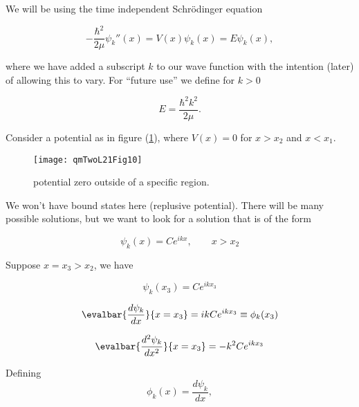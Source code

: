 We will be using the time independent Schr\"{o}dinger equation

\begin{equation}\label{eqn:qmTwoL21:430}
- \frac{\hbar^2}{2 \mu} \psi_k''(x) = V(x) \psi_k(x) = E \psi_k(x),
\end{equation}

where we have added a subscript $k$ to our wave function with the intention (later) of allowing this to vary.  For ``future use'' we define for $k > 0$

\begin{equation}\label{eqn:qmTwoL21:450}
E = \frac{\hbar^2 k^2}{2 \mu}.
\end{equation}

Consider a potential as in figure (\ref{fig:qmTwoL21:qmTwoL21Fig10}), where $V(x) = 0$ for $x > x_2$ and $x < x_1$.

\begin{figure}[htp]
   \centering
   \texttt{[image: qmTwoL21Fig10]}
   \caption{potential zero outside of a specific region.}\label{fig:qmTwoL21:qmTwoL21Fig10}
\end{figure}

We won't have bound states here (replusive potential).  There will be many possible solutions, but we want to look for a solution that is of the form

\begin{equation}\label{eqn:qmTwoL21:470}
\psi_k(x) = C e^{i k x}, \qquad x > x_2
\end{equation}

Suppose $x = x_3 > x_2$, we have 

\begin{equation}\label{eqn:qmTwoL21:490}
\psi_k(x_3) = C e^{i k x_3}
\end{equation}

\begin{equation}\label{eqn:qmTwoL21:510}
\evalbar{\frac{d\psi_k}{dx}}{x = x_3} = i k C e^{i k x_3} \equiv \phi_k(x_3)
\end{equation}

\begin{equation}\label{eqn:qmTwoL21:530}
\evalbar{\frac{d^2\psi_k}{dx^2}}{x = x_3} = -k^2 C e^{i k x_3} 
\end{equation}

Defining
\begin{equation}\label{eqn:qmTwoL21:550}
\phi_k(x) = \frac{d\psi_k}{dx},
\end{equation}

